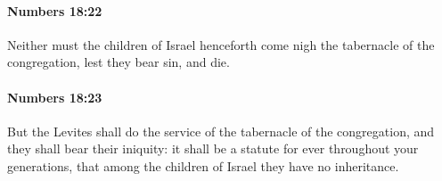 		\paragraph{Numbers 18:22} %
			\label{NUMBERS-18-22}

			Neither must the children of Israel henceforth come nigh the tabernacle of the congregation, lest they bear sin, and die.


		\paragraph{Numbers 18:23} %
			\label{NUMBERS-18-23}

			But the Levites shall do the service of the tabernacle of the congregation, and they shall bear their iniquity: it shall be a statute for ever throughout your generations, that among the children of Israel they have no inheritance.


